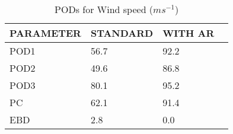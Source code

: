 \begin{table}[]
\begin{center}
\begin{tabular}{|l|l|l|l|}
\hline
\multicolumn{1}{|c|}{\cellcolor[HTML]{C0C0C0}\textbf{PARAMETER}} & \multicolumn{1}{c|}{\cellcolor[HTML]{C0C0C0}\textbf{STANDARD}} & \multicolumn{1}{c|}{\cellcolor[HTML]{C0C0C0}\textbf{WITH AR}} \\
\hline
\cellcolor[HTML]{C0C0C0}POD1  & 56.7                                & 92.2         \\
\cellcolor[HTML]{C0C0C0}POD2  & 49.6                                & 86.8         \\
\cellcolor[HTML]{C0C0C0}POD3  & 80.1                                & 95.2         \\
\cellcolor[HTML]{C0C0C0}PC    & 62.1                                  & 91.4           \\
\cellcolor[HTML]{C0C0C0}EBD   & 2.8                                 & 0.0          \\
\hline
\end{tabular}
\caption{PODs for Wind speed ($m s^{-1}$)}
\end{center}
\end{table}
